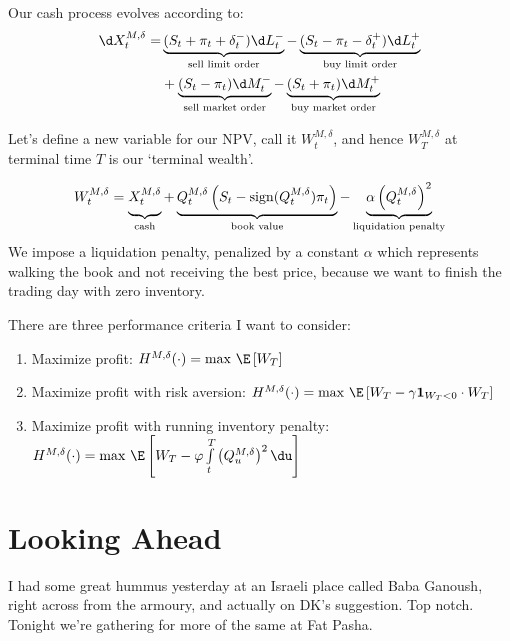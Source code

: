 \documentclass[12pt]{article}
\begin{document}
Our cash process evolves according to:
\begin{equation}\label{eq:cashprocess}
\begin{split}
\d X^{M, \delta}_t = 	&\underbrace{(S_t + \pi_t + \delta^{-}_t) \d L^{-}_t}_{\text{sell limit order}} - \underbrace{(S_t - \pi_t - \delta^{+}_t) \d L^{+}_t}_{\text{buy limit order}} \\
						&+ \underbrace{(S_t - \pi_t) \d M^{-}_t}_{\text{sell market order}} - \underbrace{(S_t + \pi_t) \d M^{+}_t}_{\text{buy market order}}
\end{split}
\end{equation} 

Let's define a new variable for our NPV, call it $W^{M, \delta}_t$, and hence $W^{M, \delta}_T$ at terminal time $T$ is our `terminal wealth'.

\begin{equation}
\label{eq:terminalwealth}
W^{M, \delta}_t = \underbrace{\vphantom{\left( Q^{M, \delta}_t) \right)}X^{M, \delta}_t}_{\text{cash}}+ \underbrace{Q^{M, \delta}_t \left( S_t - \mathrm{sign}(Q^{M, \delta}_t)\pi_t \right)}_{\text{book value}} - \underbrace{\alpha \left( Q^{M, \delta}_t \right)^2}_{\text{liquidation penalty}}
\end{equation}
We impose a liquidation penalty, penalized by a constant $\alpha$ which represents walking the book and not receiving the best price, because we want to finish the trading day with zero inventory. 

There are three performance criteria I want to consider:
\begin{enumerate}
\item Maximize profit: $H^{M, \delta}(\cdot) = \max \, \E \left[ W_T \right]$
\item Maximize profit with risk aversion: $H^{M, \delta}(\cdot) = \max \, \E \left[  W_T - \gamma \mathbf{1}_{W_T<0} \cdot W_T \right]$
\item Maximize profit with running inventory penalty: $H^{M, \delta}(\cdot) = \max \, \E \left[  W_T  - \varphi \int\limits_t^T \left( Q^{M, \delta}_u \right)^2 \du  \right]$
\end{enumerate}

\section*{Looking Ahead}
I had some great hummus yesterday at an Israeli place called Baba Ganoush, right across from the armoury, and actually on DK's suggestion. Top notch. Tonight we're gathering for more of the same at Fat Pasha. 
\end{document}
